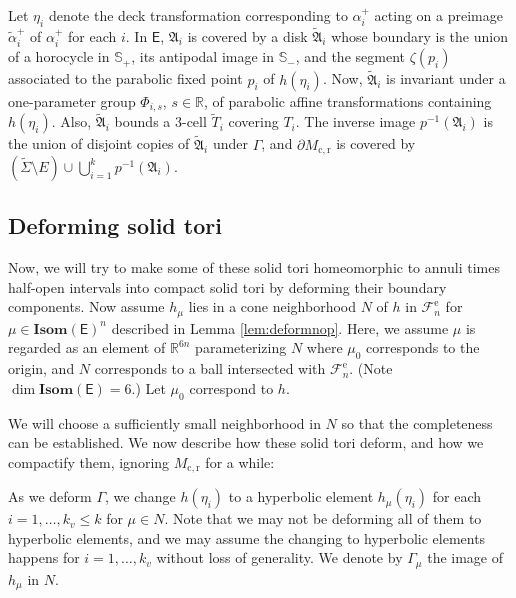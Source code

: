 \documentclass{amsart}
\numberwithin{equation}{section}
\newcommand\bR{{\mathbb{R}}}
\newcommand\ra{\rightarrow}
\newcommand\Isom{{\mathbf{Isom}}}
\newcommand\Ss{{\mathbb{S}}}
\newcommand\Lspace{\mathsf E}
\theoremstyle{definition}
\theoremstyle{remark}
\newcommand{\rome}{\mathrm e}
\newcommand{\romel}{{\mathrm{e}, \mathrm{l}}}
\newcommand{\romecr}{{\mathrm{c}, \mathrm{r}}}
\begin{document}
Let $\eta_i$ denote the deck transformation corresponding to $\alpha_i^+$ acting on a preimage $\tilde \alpha_i^+$ of $\alpha_i^+$ for each $i$. 
In $\Lspace$, ${\mathfrak{A}}_i$ is covered by a disk $\tilde {\mathfrak{A}}_i$ whose boundary is the union of 
a horocycle in $\Ss_+$, its antipodal image in $\Ss_-$, and 
the segment $\zeta(p_i)$ associated to 
the parabolic fixed point $p_i$ of $h(\eta_i)$.
Now, $\tilde {\mathfrak{A}}_i$ is invariant under a one-parameter group $\Phi_{i,s}$, $s\in \bR$, of parabolic affine transformations containing $h(\eta_i)$. 
Also, $\tilde {\mathfrak{A}}_i$ bounds a $3$-cell $\tilde T_i$ covering $T_i$. 
The inverse image $p^{-1}({\mathfrak{A}}_i)$ is the union of 
disjoint copies of $\tilde {\mathfrak{A}}_i$ under $\Gamma$, 
and $\partial M_{\romecr}$ is covered by 
$(\tilde \Sigma  \setminus E) \cup 
\bigcup_{i=1}^k p^{-1}({\mathfrak{A}}_i)$. 


\subsection{Deforming solid tori}\label{sub:deformtori} 
Now, we will try to make some of these solid tori 
homeomorphic to annuli times half-open intervals 
into compact solid tori by deforming their boundary
components. 
Now assume $h_\mu$ lies in a cone neighborhood $N$ of $h$ in $\mathcal{F}_n^{\rome}$
for $\mu \in \Isom(\Lspace)^n$ 
described in Lemma \ref{lem:deformnop}.
Here, we assume $\mu$ is regarded as an element of $\bR^{6n}$ parameterizing $N$ where $\mu_0$ corresponds to the origin, and $N$ corresponds to a ball intersected with 
$\mathcal{F}_n^{\rome}$. 
(Note $\dim \Isom(\Lspace) = 6$.) 
Let $\mu_0$ correspond to $h$. 

We will choose a sufficiently small neighborhood in $N$ so that the completeness can be established. 
We now describe how these solid tori deform, 
and how we compactify them, ignoring $M_{\romecr}$ for a while: 

As we deform $\Gamma$, we change
$h(\eta_i)$ to a hyperbolic element $h_\mu(\eta_i)$ for 
each $i=1, \dots, k_v \leq k$ for $\mu\in N$.  
Note that we may not be deforming all of them to hyperbolic elements,
and we may assume the changing to hyperbolic elements 
happens for $i=1, \dots, k_v$ 
without loss of generality. 
We denote by $\Gamma_\mu$ the image of $h_\mu$ in $N$. 


\end{document}
